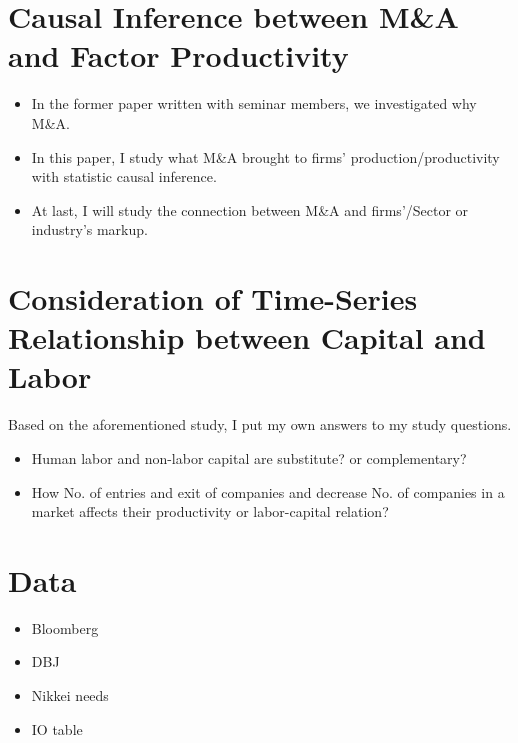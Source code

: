 \documentclass[aspectratio=169, dvipdfmx, 11pt]{beamer}
\begin{document}
\section[Easy Causal Inference]{Causal Inference between M\&A and Factor Productivity}
\begin{frame}
    \begin{itemize}
        \setlength{\itemsep}{8mm}
        \item In the former paper written with seminar members, we investigated why M\&A.
        \item In this paper, I study what M\&A brought to firms' production/productivity with statistic causal inference.
        \item At last, I will study the connection between M\&A and firms'/Sector or industry's markup.
    \end{itemize}
\end{frame}

\section[Capital or/and Labor]{Consideration of Time-Series Relationship between Capital and Labor}
\begin{frame}Based on the aforementioned study, I put my own answers to my study questions.
    \vspace{12mm}
    \begin{itemize}
        \setlength{\itemsep}{8mm}
        \item Human labor and non-labor capital are substitute? or complementary?
        \item How No. of entries and exit of companies and decrease No. of companies in a market affects their productivity or labor-capital relation?
    \end{itemize}

\end{frame}
\section{Data}
\begin{frame}
    \begin{itemize}
        \setlength{\itemsep}{5mm}
        \item Bloomberg
        \item DBJ
        \item Nikkei needs
        \item IO table
    \end{itemize}
\end{frame}
\end{document}
